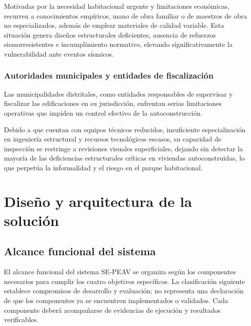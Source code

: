 \documentclass[12pt,oneside]{report}
\begin{document}
Motivadas por la necesidad habitacional urgente y limitaciones económicas, recurren a conocimientos empíricos, mano de obra familiar o de maestros de obra no especializados, además de emplear materiales de calidad variable. Esta situación genera diseños estructurales deficientes, ausencia de refuerzos sismorresistentes e incumplimiento normativo, elevando significativamente la vulnerabilidad ante eventos sísmicos.\par

\subsection{Autoridades municipales y entidades de fiscalización}
Las municipalidades distritales, como entidades responsables de supervisar y fiscalizar las edificaciones en su jurisdicción, enfrentan serias limitaciones operativas que impiden un control efectivo de la autoconstrucción.\par

Debido a que cuentan con equipos técnicos reducidos, insuficiente especialización en ingeniería estructural y recursos tecnológicos escasos, su capacidad de inspección se restringe a revisiones visuales superficiales, dejando sin detectar la mayoría de las deficiencias estructurales críticas en viviendas autoconstruidas, lo que perpetúa la informalidad y el riesgo en el parque habitacional.\par


\chapter{Diseño y arquitectura de la solución}

\section{Alcance funcional del sistema}

El alcance funcional del sistema SE-PEAV se organiza según los componentes necesarios para cumplir los cuatro objetivos específicos. La clasificación siguiente establece compromisos de desarrollo y evaluación; no representa una declaración de que los componentes ya se encuentren implementados o validados. Cada componente deberá acompañarse de evidencias de ejecución y resultados verificables.\par
\end{document}
